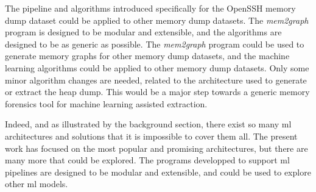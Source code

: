 The pipeline and algorithms introduced specifically for the OpenSSH memory dump dataset could be applied to other memory dump datasets. The \textit{mem2graph} program is designed to be modular and extensible, and the algorithms are designed to be as generic as possible. The \textit{mem2graph} program could be used to generate memory graphs for other memory dump datasets, and the machine learning algorithms could be applied to other memory dump datasets. Only some minor algorithm changes are needed, related to the architecture used to generate or extract the heap dump. This would be a major step towards a generic memory forensics tool for machine learning assisted extraction.

Indeed, and as illustrated by the background section, there exist so many \acrshort{ml} architectures and solutions that it is impossible to cover them all. The present work has focused on the most popular and promising architectures, but there are many more that could be explored. The programs developped to support \acrshort{ml} pipelines are designed to be modular and extensible, and could be used to explore other \acrshort{ml} models.